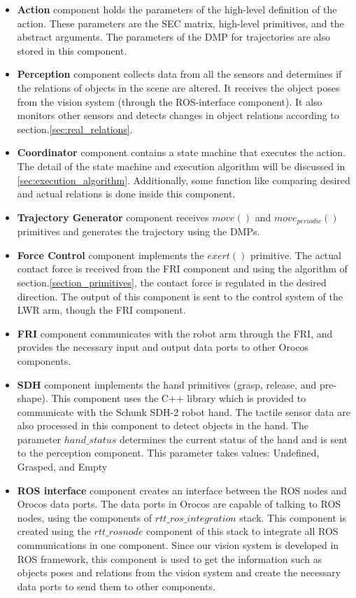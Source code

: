 \begin{itemize}
 \item{\textbf{Action}}
component holds the parameters of the high-level definition of the action.
These parameters are the SEC matrix, high-level primitives, and the abstract arguments.
The parameters of the DMP for trajectories are also stored in this component.
\item{\textbf{Perception}}
component collects data from all the sensors and determines if the relations of objects in the scene are altered.
It receives the object poses from the vision system (through the ROS-interface component).
It also monitors other sensors and detects changes in object relations according to section.\ref{sec:real_relations}.
\item{\textbf{Coordinator}}
component contains a state machine that executes the action.
The detail of the state machine and execution algorithm will be discussed in \ref{sec:execution_algorithm}.
Additionally, some function like comparing desired and actual relations is done inside this component.

\item{\textbf{Trajectory Generator}}
component receives $move()$ and $move_{periodic}()$ primitives and generates the trajectory using the DMPs.

\item{\textbf{Force Control}}
component implements the $exert()$ primitive.
The actual contact force is received from the FRI component and using the algorithm of section.\ref{section_primitives},
the contact force is regulated in the desired direction.
The output of this component is sent to the control system of the LWR arm, though the FRI component.

\item{\textbf{FRI}}
component communicates with the robot arm through the FRI,
and provides the necessary input and output data ports to other Orocos components.

\item{\textbf{SDH}}
component implements the hand primitives (grasp, release, and pre-shape).
This component uses the C++ library which is provided to communicate with the Schunk SDH-2 robot hand.
The tactile sensor data are also processed in this component to detect objects in the hand.
The parameter $hand\_status$ determines the current status of the hand and is sent to the perception component.
This parameter takes values: Undefined, Grasped, and Empty

\item{\textbf{ROS interface}}
component creates an interface between the ROS nodes and Orocos data ports.
The data ports in Orocos are capable of talking to ROS nodes, using the components of $rtt\_ros\_integration$ stack.
This component is created using the $rtt\_rosnode$ component of this stack to integrate all ROS communications in one component.
Since our vision system is developed in ROS framework, this component is used to get the information such as 
objects poses and relations from the vision system and create the necessary data ports to send them to other components.
\end{itemize}



